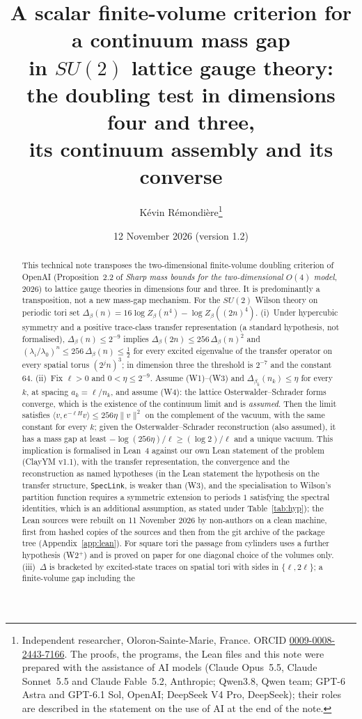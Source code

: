\documentclass[11pt,a4paper]{article}
\title{A scalar finite-volume criterion for a continuum mass gap\\ in $SU(2)$ lattice gauge theory:\\ the doubling test in dimensions four and three,\\ its continuum assembly and its converse}
\author{K\'evin R\'emondi\`ere\thanks{Independent researcher, Oloron-Sainte-Marie, France. ORCID
\href{https://orcid.org/0009-0008-2443-7166}{0009-0008-2443-7166}. The proofs, the programs, the Lean files and this note were
prepared with the assistance of AI models (Claude Opus~5.5, Claude Sonnet~5.5 and Claude Fable~5.2, Anthropic; Qwen3.8, Qwen team; GPT-6 Astra and GPT-6.1 Sol, OpenAI; DeepSeek V4 Pro, DeepSeek); their roles are described in the
statement on the use of AI at the end of the note.}}
\date{12 November 2026 (version 1.2)}
\theoremstyle{plain}
\theoremstyle{definition}
\theoremstyle{remark}
\numberwithin{equation}{section}
\begin{document}
\maketitle

\begin{abstract}
This technical note transposes the two-dimensional finite-volume doubling criterion of OpenAI (Proposition~2.2 of \emph{Sharp mass bounds
for the two-dimensional $O(4)$ model}, 2026) to lattice gauge theories in dimensions four and three. It is predominantly a transposition,
not a new mass-gap mechanism. For the $SU(2)$ Wilson theory on periodic tori set
$\Delta_\beta(n)=16\log Z_\beta(n^4)-\log Z_\beta((2n)^4)$.
(i)~Under hypercubic symmetry and a positive trace-class transfer representation (a standard hypothesis, not formalised),
$\Delta_\beta(n)\le2^{-9}$ implies $\Delta_\beta(2n)\le256\,\Delta_\beta(n)^2$ and
$(\lambda_i/\lambda_0)^n\le256\,\Delta_\beta(n)\le\frac12$ for every excited eigenvalue of the transfer operator on every spatial torus
$(2^jn)^3$; in dimension three the threshold is $2^{-7}$ and the constant $64$.
(ii)~Fix $\ell>0$ and $0<\eta\le2^{-9}$. Assume (W1)--(W3) and $\Delta_{\beta_k}(n_k)\le\eta$ for every $k$, at spacing $a_k=\ell/n_k$, and assume (W4): the lattice
Osterwalder--Schrader forms converge, which is the existence of the continuum limit and is \emph{assumed}. Then the limit satisfies
$\langle v,e^{-\ell H}v\rangle\le256\eta\|v\|^2$ on the complement of the vacuum, with the same constant for every $k$; given the
Osterwalder--Schrader reconstruction (also assumed), it has a mass gap at least $-\log(256\eta)/\ell\ge(\log2)/\ell$ and a unique vacuum.
This implication is formalised in Lean~4 against our own Lean statement of the problem (ClayYM v1.1), with the transfer representation, the
convergence and the reconstruction as named hypotheses (in the Lean statement the hypothesis on the transfer structure, \texttt{SpecLink}, is weaker than (W3), and the specialisation to Wilson's partition function requires a symmetric extension to periods $1$ satisfying the spectral identities, which is an additional assumption, as stated under Table~\ref{tab:hyp}); the Lean sources were rebuilt on 11 November 2026 by non-authors on a clean
machine, first from hashed copies of the sources and then from the git archive of the package tree (Appendix~\ref{app:lean}). For square tori the passage from cylinders uses a further hypothesis (W2$^+$) and is proved on paper for one
diagonal choice of the volumes only.
(iii)~$\Delta$ is bracketed by excited-state traces on spatial tori with sides in $\{\ell,2\ell\}$; a finite-volume gap including the

\end{abstract}
\end{document}
